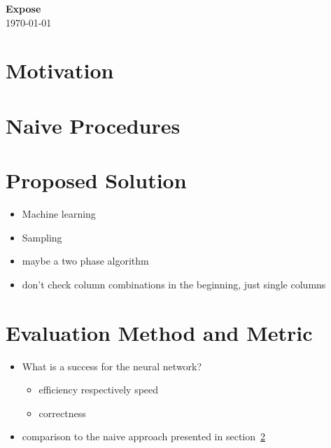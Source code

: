 \documentclass[a4paper]{article}
\begin{document}
\reversemarginpar{}
\thispagestyle{firstpagestyle}
\begin{center}
  \huge \textbf{Expose}\\[8pt]
  \normalsize \today
\end{center}

\section{Motivation}


\section{Naive Procedures}\label{sec:naiveProcedures}

\section{Proposed Solution}
\begin{itemize}
  \item Machine learning
  \item Sampling
  \item maybe a two phase algorithm
  \item don't check column combinations in the beginning, just single columns
\end{itemize}

\section{Evaluation Method and Metric}
\begin{itemize}
  \item What is a success for the neural network?
        \begin{itemize}[label=\(\rightarrow \)]
          \item efficiency respectively speed
          \item correctness
        \end{itemize}
  \item comparison to the naive approach presented in section~\ref{sec:naiveProcedures}
\end{itemize}
\end{document}
